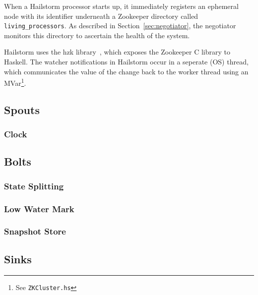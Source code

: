 \documentclass[10pt,nocopyrightspace]{sigplanconf}
\begin{document}
When a Hailstorm processor starts up, it immediately registers an ephemeral node
with its identifier underneath a Zookeeper directory called
\texttt{living\_processors}. As described in Section~\ref{sec:negotiator}, the
negotiator monitors this directory to ascertain the health of the system.

Hailstorm uses the hzk library~\cite{hzk}, which exposes the
Zookeeper C library to Haskell. The watcher notifications in Hailstorm occur in
a seperate (OS) thread, which communicates the value of the change
back to the worker thread using an MVar\footnote{See \texttt{ZKCluster.hs}}.

\subsection{Spouts}

\subsubsection{Clock}
\label{sec:clock}

\subsection{Bolts}

\subsubsection{State Splitting}

\subsubsection{Low Water Mark}

\subsubsection{Snapshot Store}
\label{sec:snapshot}

\subsection{Sinks}
\end{document}
